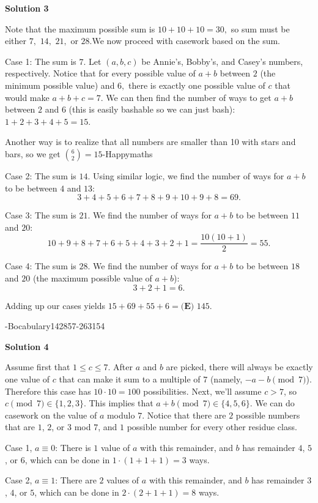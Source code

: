 \begin{enumerate}
\textbf{Solution 3}

Note that the maximum possible sum is $10+10+10=30,$ so sum must be either $7,$ $14,$ $21,$ or $28.$We now proceed with casework based on the sum.

 Case 1: The sum is $7.$ Let $(a,b,c)$ be Annie’s, Bobby’s, and Casey’s numbers, respectively. Notice that for every possible value of $a+b$ between $2$ (the minimum possible value) and $6,$ there is exactly one possible value of $c$ that would make $a+b+c=7.$ We can then find the number of ways to get $a+b$ between $2$ and $6$ (this is easily bashable so we can just bash): $1+2+3+4+5=15.$

 Another way is to realize that all numbers are smaller than 10 with stars and bars, so we get $\binom{6}{2}=15$-Happymaths

 Case 2: The sum is $14.$ Using similar logic, we find the number of ways for $a+b$ to be between $4$ and $13:$ 
 \[3+4+5+6+7+8+9+10+9+8=69.\]

 Case 3: The sum is $21.$ We find the number of ways for $a+b$ to be between $11$ and $20:$ 
 \[10+9+8+7+6+5+4+3+2+1=\frac{10(10+1)}{2}=55.\]

 Case 4: The sum is $28.$ We find the number of ways for $a+b$ to be between $18$ and $20$ (the maximum possible value of $a+b$): 
 \[3+2+1=6.\]

 Adding up our cases yields $15+69+55+6=\boxed{\textbf{(E) }145}$.

 -Bocabulary142857-263154

 



\textbf{Solution 4}

Assume first that $1 \le c \le 7$. After $a$ and $b$ are picked, there will always be exactly one value of $c$ that can make it sum to a multiple of $7$ (namely, $-a-b \pmod 7$). Therefore this case has $10 \cdot 10=100$ possibilities. Next, we'll assume $c>7$, so $c \pmod 7 \in \{ 1, 2, 3\}$. This implies that $a+b \pmod 7 \in \{ 4, 5, 6\}$. We can do casework on the value of $a$ modulo $7$. Notice that there are $2$ possible numbers that are $1$, $2$, or $3$ mod $7$, and $1$ possible number for every other residue class. 

 Case 1, $a \equiv 0$: There is $1$ value of $a$ with this remainder, and $b$ has remainder $4$, $5$, or $6$, which can be done in $1 \cdot (1+1+1)=3$ ways.

 Case 2, $a \equiv 1$: There are $2$ values of $a$ with this remainder, and $b$ has remainder $3$, $4$, or $5$, which can be done in $2 \cdot (2+1+1)=8$ ways.


\end{enumerate}
